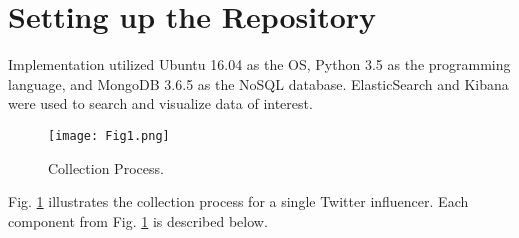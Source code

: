 \section{Setting up the Repository}

Implementation utilized Ubuntu 16.04 as the OS, Python 3.5 as the programming language, and MongoDB 3.6.5 as the NoSQL database. %
ElasticSearch and Kibana were used to search and visualize data of interest.

\begin{figure}[htbp]
\centerline{\texttt{[image: Fig1.png]}}
\caption{Collection Process.}
\label{fig_ch7_1}
\end{figure}

Fig. \ref{fig_ch7_1} illustrates the collection process for a single Twitter influencer. %
Each component from Fig. \ref{fig_ch7_1} is described below.

